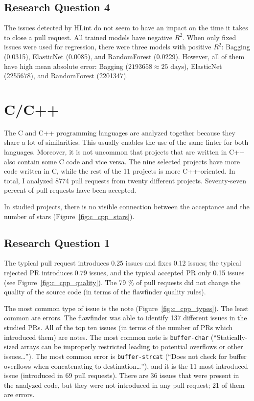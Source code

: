 \documentclass[digital,oneside,oldtable,nolof,nolot,nocover]{fithesis4}
\begin{document}
\subsection{Research Question 4}
\label{sec:orge274dae}
The issues detected by HLint do not seem to have an impact on the time it takes to close a pull request.
All trained models have negative \(R^2\). When only fixed issues were used for regression, there
were three models with positive \(R^2\): Bagging (0.0315), ElasticNet (0.0085), and RandomForest (0.0229).
However, all of them have high mean absolute error: Bagging (\(2193658 \approx 25\text{ days}\)),
ElasticNet (2255678), and RandomForest (2201347).
\FloatBarrier
\section{C/C++}
\label{sec:orgb796d0f}
The C and C++ programming languages are analyzed together because they share
a lot of similarities.  This usually enables the use of the same linter for both
languages. Moreover, it is not uncommon that projects that are written in C++
also contain some C code and vice versa.
The nine selected projects have more code written in C, while the rest of the
11 projects is more C++-oriented. In total, I analyzed 8774 pull requests
from twenty different projects. Seventy-seven percent of pull requests have been accepted.

In studied projects, there is no visible connection between the acceptance
and the number of stars (Figure~\ref{fig:c_cpp_stars}).
\subsection{Research Question 1}
\label{sec:orgfbca029}
The typical pull request introduces 0.25 issues and fixes 0.12 issues; the typical
rejected PR introduces 0.79 issues, and the typical accepted PR only 0.15 issues (see Figure~\ref{fig:c_cpp_quality}).
The 79 \% of pull requests did not change the quality of the source code
(in terms of the flawfinder quality rules).

The most common type of issue is the note (Figure~\ref{fig:c_cpp_types}).
The least common are errors. The flawfinder was able to identify 137 different issues in the studied
PRs. All of the top ten issues (in terms of the number of PRs which introduced
them) are notes. The most common note is \texttt{buffer-char} (``Statically-sized
arrays can be improperly restricted leading to potential overflows or other
issues\dots{}''). The most common error is \texttt{buffer-strcat} (``Does not check
for buffer overflows when concatenating to destination\dots{}''), and it is the
11 most introduced issue (introduced in 69 pull requests). There are 36 issues
that were present in the analyzed code, but they were not introduced in any
pull request; 21 of them are errors.
\end{document}
